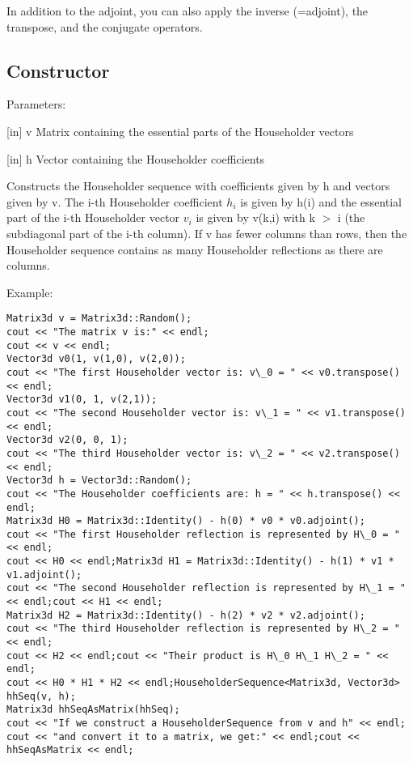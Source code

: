 In addition to the adjoint, you can also apply the inverse (=adjoint), the transpose, and the conjugate operators.


\subsection{Constructor}
Parameters:

[in] v Matrix containing the essential parts of the Householder vectors  

[in] h Vector containing the Householder coefficients 

Constructs the Householder sequence with coefficients given by h and vectors given by v. The i-th Householder coefficient $h_i$ is given by h(i) and the essential part of the i-th Householder vector $v_i$ is given by v(k,i) with k $>$ i (the subdiagonal part of the i-th column). If v has fewer columns than rows, then the Householder sequence contains as many Householder reflections as there are columns.


Example:
\begin{lstlisting}
Matrix3d v = Matrix3d::Random();
cout << "The matrix v is:" << endl;
cout << v << endl;
Vector3d v0(1, v(1,0), v(2,0));
cout << "The first Householder vector is: v\_0 = " << v0.transpose() << endl;
Vector3d v1(0, 1, v(2,1));
cout << "The second Householder vector is: v\_1 = " << v1.transpose()  << endl;
Vector3d v2(0, 0, 1);
cout << "The third Householder vector is: v\_2 = " << v2.transpose() << endl;
Vector3d h = Vector3d::Random();
cout << "The Householder coefficients are: h = " << h.transpose() << endl;
Matrix3d H0 = Matrix3d::Identity() - h(0) * v0 * v0.adjoint();
cout << "The first Householder reflection is represented by H\_0 = " << endl;
cout << H0 << endl;Matrix3d H1 = Matrix3d::Identity() - h(1) * v1 * v1.adjoint();
cout << "The second Householder reflection is represented by H\_1 = " << endl;cout << H1 << endl;
Matrix3d H2 = Matrix3d::Identity() - h(2) * v2 * v2.adjoint();
cout << "The third Householder reflection is represented by H\_2 = " << endl;
cout << H2 << endl;cout << "Their product is H\_0 H\_1 H\_2 = " << endl;
cout << H0 * H1 * H2 << endl;HouseholderSequence<Matrix3d, Vector3d> hhSeq(v, h);
Matrix3d hhSeqAsMatrix(hhSeq);
cout << "If we construct a HouseholderSequence from v and h" << endl;
cout << "and convert it to a matrix, we get:" << endl;cout << hhSeqAsMatrix << endl;
\end{lstlisting}

